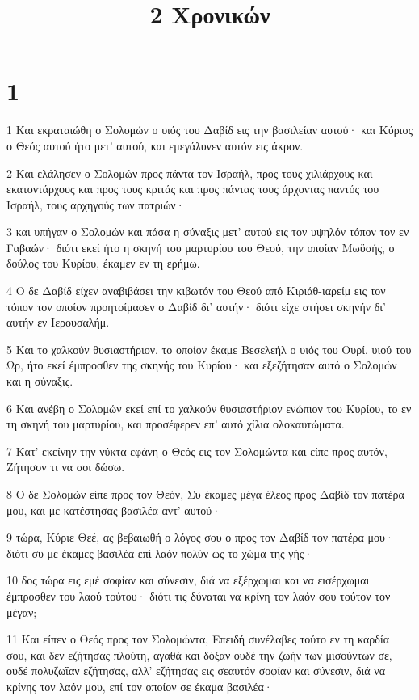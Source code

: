 

\title{2 Χρονικών}


\chapter{1}

\par 1 Και εκραταιώθη ο Σολομών ο υιός του Δαβίδ εις την βασιλείαν αυτού· και Κύριος ο Θεός αυτού ήτο μετ' αυτού, και εμεγάλυνεν αυτόν εις άκρον.
\par 2 Και ελάλησεν ο Σολομών προς πάντα τον Ισραήλ, προς τους χιλιάρχους και εκατοντάρχους και προς τους κριτάς και προς πάντας τους άρχοντας παντός του Ισραήλ, τους αρχηγούς των πατριών·
\par 3 και υπήγαν ο Σολομών και πάσα η σύναξις μετ' αυτού εις τον υψηλόν τόπον τον εν Γαβαών· διότι εκεί ήτο η σκηνή του μαρτυρίου του Θεού, την οποίαν Μωϋσής, ο δούλος του Κυρίου, έκαμεν εν τη ερήμω.
\par 4 Ο δε Δαβίδ είχεν αναβιβάσει την κιβωτόν του Θεού από Κιριάθ-ιαρείμ εις τον τόπον τον οποίον προητοίμασεν ο Δαβίδ δι' αυτήν· διότι είχε στήσει σκηνήν δι' αυτήν εν Ιερουσαλήμ.
\par 5 Και το χαλκούν θυσιαστήριον, το οποίον έκαμε Βεσελεήλ ο υιός του Ουρί, υιού του Ωρ, ήτο εκεί έμπροσθεν της σκηνής του Κυρίου· και εξεζήτησαν αυτό ο Σολομών και η σύναξις.
\par 6 Και ανέβη ο Σολομών εκεί επί το χαλκούν θυσιαστήριον ενώπιον του Κυρίου, το εν τη σκηνή του μαρτυρίου, και προσέφερεν επ' αυτό χίλια ολοκαυτώματα.
\par 7 Κατ' εκείνην την νύκτα εφάνη ο Θεός εις τον Σολομώντα και είπε προς αυτόν, Ζήτησον τι να σοι δώσω.
\par 8 Ο δε Σολομών είπε προς τον Θεόν, Συ έκαμες μέγα έλεος προς Δαβίδ τον πατέρα μου, και με κατέστησας βασιλέα αντ' αυτού·
\par 9 τώρα, Κύριε Θεέ, ας βεβαιωθή ο λόγος σου ο προς τον Δαβίδ τον πατέρα μου· διότι συ με έκαμες βασιλέα επί λαόν πολύν ως το χώμα της γής·
\par 10 δος τώρα εις εμέ σοφίαν και σύνεσιν, διά να εξέρχωμαι και να εισέρχωμαι έμπροσθεν του λαού τούτου· διότι τις δύναται να κρίνη τον λαόν σου τούτον τον μέγαν;
\par 11 Και είπεν ο Θεός προς τον Σολομώντα, Επειδή συνέλαβες τούτο εν τη καρδία σου, και δεν εζήτησας πλούτη, αγαθά και δόξαν ουδέ την ζωήν των μισούντων σε, ουδέ πολυζωΐαν εζήτησας, αλλ' εζήτησας εις σεαυτόν σοφίαν και σύνεσιν, διά να κρίνης τον λαόν μου, επί τον οποίον σε έκαμα βασιλέα·
